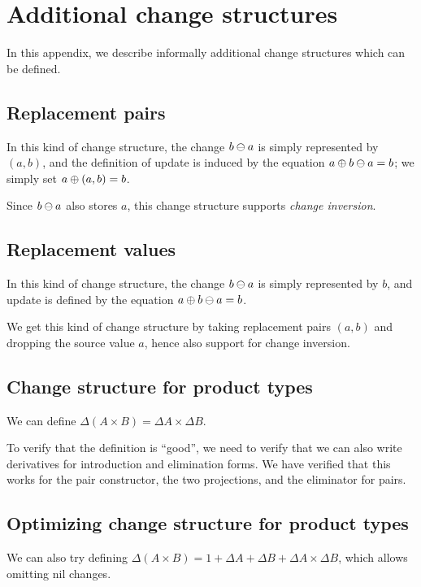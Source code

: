 \section{Additional change structures}
\label{sec:additional}
In this appendix, we describe informally additional change structures which can be defined.


\subsection{Replacement pairs}
In this kind of change structure, %
the change $\Diff{b}{a}$ is simply represented by $(a, b)$, and
the definition of update is induced by the equation $\Update{a}{\Diff{b}{a}} = b$; we simply set
$\Update{a}{(a, b)} = b$.

Since $\Diff{b}{a}$ also stores $a$, this change structure
supports \emph{change inversion}.

\subsection{Replacement values}
In this kind of change structure, %
the change $\Diff{b}{a}$ is simply represented by $b$, and
update is defined by the equation $\Update{a}{\Diff{b}{a}} = b$.

We get this kind of change structure by taking replacement pairs
$(a, b)$ and dropping the source value %
$a$, hence also support for change inversion.

\subsection{Change structure for product types}
We can define $\Delta(A \times B) = \Delta{A} \times \Delta{B}$.

To verify that the definition is ``good'', we need to verify that
we can also write derivatives for introduction and elimination
forms. We have verified that this works for the pair constructor,
the two projections, and the eliminator for pairs.

\subsection{Optimizing change structure for product types}
We can also try defining
$\Delta(A \times B) = 1 + \Delta{A} + \Delta{B} + \Delta{A}
\times \Delta{B}$, which allows omitting nil changes.

